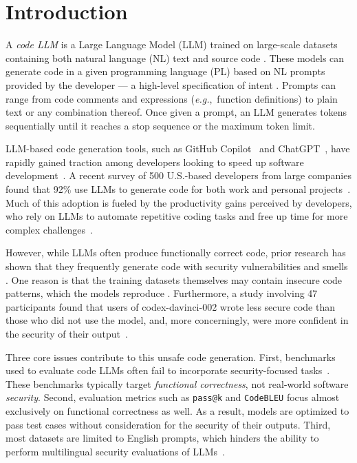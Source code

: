 \documentclass[pdflatex,sn-mathphys-ay]{sn-jnl}
\newcommand{\eg}{\textit{e.g.},\ }
\begin{document}
\section{Introduction}

A \textit{code LLM} is a Large Language Model (LLM) trained on large-scale datasets containing both natural language (NL) text and source code \cite{allamanis2018survey}. These models can generate code in a given programming language (PL) based on NL prompts provided by the developer — a high-level specification of intent \cite{Le_2021}. Prompts can range from code comments and expressions (\eg function definitions) to plain text or any combination thereof. Once given a prompt, an LLM generates tokens sequentially until it reaches a stop sequence or the maximum token limit.

LLM-based code generation tools, such as GitHub Copilot~\cite{copilot} and ChatGPT~\cite{chatgpt}, have rapidly gained traction among developers looking to speed up software development~\cite{albert22}. A recent survey of 500 U.S.-based developers from large companies found that 92\% use LLMs to generate code for both work and personal projects~\cite{shani2023survey}. Much of this adoption is fueled by the productivity gains perceived by developers, who rely on LLMs to automate repetitive coding tasks and free up time for more complex challenges~\cite{albert22}.

However, while LLMs often produce functionally correct code, prior research has shown that they frequently generate code with security vulnerabilities and smells \cite{pearce2021, perry2022users, sandoval2022security, siddiq2024devgpt}. One reason is that the training datasets themselves may contain insecure code patterns, which the models reproduce \cite{siddiq2022empirical}. Furthermore, a study involving 47 participants found that users of \textsf{codex-davinci-002} wrote less secure code than those who did not use the model, and, more concerningly, were more confident in the security of their output~\cite{perry2022users}.

Three core issues contribute to this unsafe code generation. First, benchmarks used to evaluate code LLMs often fail to incorporate security-focused tasks~\cite{siddiq2022seceval, zan2023NL2Code}. These benchmarks typically target \textit{functional correctness}, not real-world software \textit{security}. Second, evaluation metrics such as \texttt{pass@k} \cite{HumanEval,raihan2025mhumaneval} and \texttt{CodeBLEU} \cite{CodeBLEU} focus almost exclusively on functional correctness as well. As a result, models are optimized to pass test cases without consideration for the security of their outputs. Third, most datasets are limited to English prompts, which hinders the ability to perform multilingual security evaluations of LLMs~\cite{peng-etal-2024-humaneval}.
\end{document}
